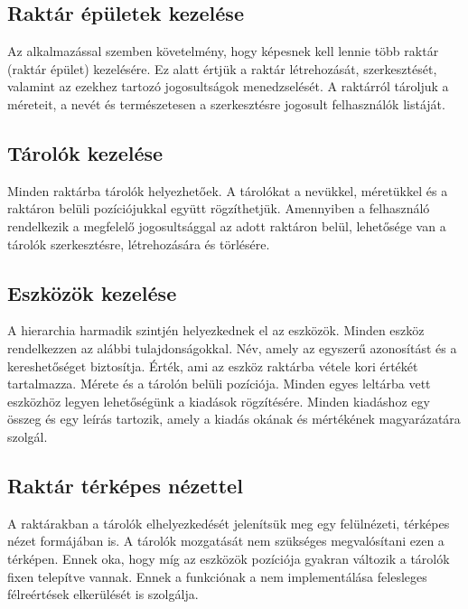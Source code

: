 \subsection{Raktár épületek kezelése}
Az alkalmazással szemben követelmény, hogy képesnek kell lennie több raktár (raktár épület) kezelésére.
Ez alatt értjük a raktár létrehozását, szerkesztését, valamint az ezekhez tartozó jogosultságok menedzselését.
A raktárról tároljuk a méreteit, a nevét és természetesen a szerkesztésre jogosult felhasználók listáját.

\subsection{Tárolók kezelése}
Minden raktárba tárolók helyezhetőek. A tárolókat a nevükkel, méretükkel és a raktáron belüli pozíciójukkal együtt rögzíthetjük.
Amennyiben a felhasználó rendelkezik a megfelelő jogosultsággal az adott raktáron belül, lehetősége van a tárolók szerkesztésre, létrehozására és törlésére.

\subsection{Eszközök kezelése}
A hierarchia harmadik szintjén helyezkednek el az eszközök. 
Minden eszköz rendelkezzen az alábbi tulajdonságokkal.
Név, amely az egyszerű azonosítást és a kereshetőséget biztosítja.
Érték, ami az eszköz raktárba vétele kori értékét tartalmazza.
Mérete és a tárolón belüli pozíciója.
Minden egyes leltárba vett eszközhöz legyen lehetőségünk a kiadások rögzítésére.
Minden kiadáshoz egy összeg és egy leírás tartozik, amely a kiadás okának és mértékének magyarázatára szolgál.

\subsection{Raktár térképes nézettel}
A raktárakban a tárolók elhelyezkedését jelenítsük meg egy felülnézeti, térképes nézet formájában is.
A tárolók mozgatását nem szükséges megvalósítani ezen a térképen.
Ennek oka, hogy míg az eszközök pozíciója gyakran változik a tárolók fixen telepítve vannak.
Ennek a funkciónak a nem implementálása felesleges félreértések elkerülését is szolgálja.

